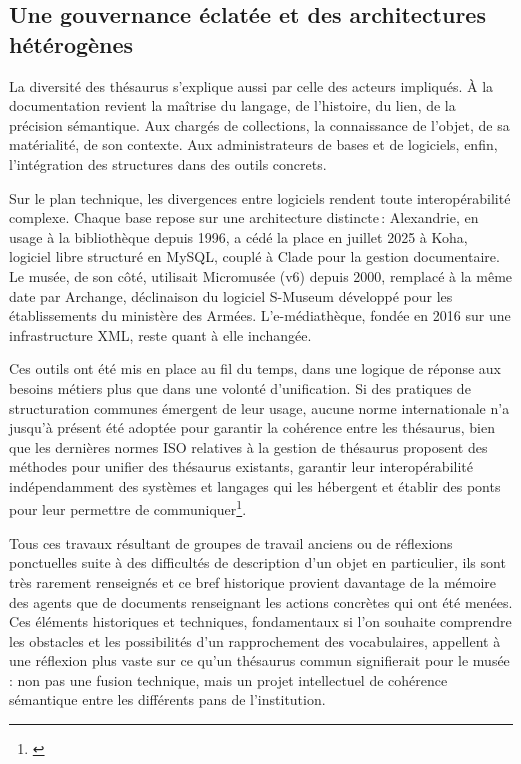 \subsection{Une gouvernance éclatée et des architectures hétérogènes}

La diversité des thésaurus s’explique aussi par celle des acteurs impliqués. À la documentation revient la maîtrise du langage, de l'histoire, du lien, de la précision sémantique. Aux chargés de collections, la connaissance de l’objet, de sa matérialité, de son contexte. Aux administrateurs de bases et de logiciels, enfin, l’intégration des structures dans des outils concrets.

Sur le plan technique, les divergences entre logiciels rendent toute interopérabilité complexe. Chaque base repose sur une architecture distincte : Alexandrie, en usage à la bibliothèque depuis 1996, a cédé la place en juillet 2025 à Koha, logiciel libre structuré en MySQL, couplé à Clade pour la gestion documentaire. Le musée, de son côté, utilisait Micromusée (v6) depuis 2000, remplacé à la même date par Archange, déclinaison du logiciel S-Museum développé pour les établissements du ministère des Armées. L’e-médiathèque, fondée en 2016 sur une infrastructure XML, reste quant à elle inchangée.

Ces outils ont été mis en place au fil du temps, dans une logique de réponse aux besoins métiers plus que dans une volonté d’unification. Si des pratiques de structuration communes émergent de leur usage, aucune norme internationale n’a jusqu’à présent été adoptée pour garantir la cohérence entre les thésaurus, bien que les dernières normes ISO relatives à la gestion de thésaurus proposent des méthodes pour unifier des thésaurus existants, garantir leur interopérabilité indépendamment des systèmes et langages qui les hébergent et établir des ponts pour leur permettre de communiquer\footnote{\cite{chichereau_normes_2007}}.

\bigskip

Tous ces travaux résultant de groupes de travail anciens ou de réflexions ponctuelles suite à des difficultés de description d'un objet en particulier, ils sont très rarement renseignés et ce bref historique provient davantage de la mémoire des agents que de documents renseignant les actions concrètes qui ont été menées. Ces éléments historiques et techniques,  fondamentaux si l’on souhaite comprendre les obstacles et les possibilités d’un rapprochement des vocabulaires, appellent à une réflexion plus vaste sur ce qu’un thésaurus commun signifierait pour le musée : non pas une fusion technique, mais un projet intellectuel de cohérence sémantique entre les différents pans de l’institution.